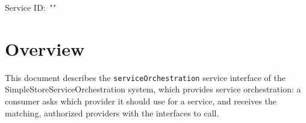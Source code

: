 \documentclass[a4paper]{arrowhead}
\begin{document}
\sloppy

\ArrowheadSetup

\begin{center}
  \vspace*{1cm}
  \huge{\arrowtitle}

  \vspace*{0.2cm}
  \LARGE{\arrowtype}
  \vspace*{1cm}

  \Large{Service ID: \textit{"\arrowid"}}

  \vspace*{\fill}


  \vspace*{1cm}
  \vspace*{\fill}

  \begin{abstract}
    This document describes the HTTP/1.1 protocol with TLS payload security and JSON payload encoding variant of the \texttt{service\allowbreak{}Orchestration} service of the SimpleStoreServiceOrchestration system.
  \end{abstract}

  \vspace*{1cm}
\end{center}

\newpage

\tableofcontents
\newpage

\section{Overview}
\label{sec:overview}

This document describes the \texttt{service\allowbreak{}Orchestration} service interface of the SimpleStoreServiceOrchestration system, which provides service orchestration: a consumer asks which provider it should use for a service, and receives the matching, authorized providers with the interfaces to call.
\end{document}
